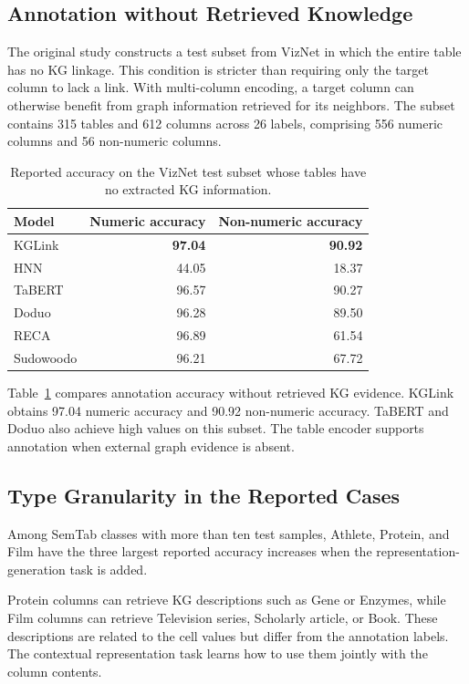 \subsection{Annotation without Retrieved Knowledge}
\label{sec:kglink:no-kg}

The original study constructs a test subset from VizNet in which the entire table has no KG linkage. This condition is stricter than requiring only the target column to lack a link. With multi-column encoding, a target column can otherwise benefit from graph information retrieved for its neighbors. The subset contains 315 tables and 612 columns across 26 labels, comprising 556 numeric columns and 56 non-numeric columns.

\begin{table}[tbp]
\centering
\caption{Reported accuracy on the VizNet test subset whose tables have no extracted KG information.}
\label{tab:kglink:no-kg}
\begin{tabular}{lrr}
\toprule
Model&Numeric accuracy&Non-numeric accuracy\\
\midrule
KGLink&\textbf{97.04}&\textbf{90.92}\\
HNN&44.05&18.37\\
TaBERT&96.57&90.27\\
Doduo&96.28&89.50\\
RECA&96.89&61.54\\
Sudowoodo&96.21&67.72\\
\bottomrule
\end{tabular}
\end{table}

Table~\ref{tab:kglink:no-kg} compares annotation accuracy without retrieved KG evidence. KGLink obtains 97.04 numeric accuracy and 90.92 non-numeric accuracy. TaBERT and Doduo also achieve high values on this subset. The table encoder supports annotation when external graph evidence is absent.

\subsection{Type Granularity in the Reported Cases}
\label{sec:kglink:qualitative}

Among SemTab classes with more than ten test samples, Athlete, Protein, and Film have the three largest reported accuracy increases when the representation-generation task is added.

Protein columns can retrieve KG descriptions such as Gene or Enzymes, while Film columns can retrieve Television series, Scholarly article, or Book. These descriptions are related to the cell values but differ from the annotation labels. The contextual representation task learns how to use them jointly with the column contents.

